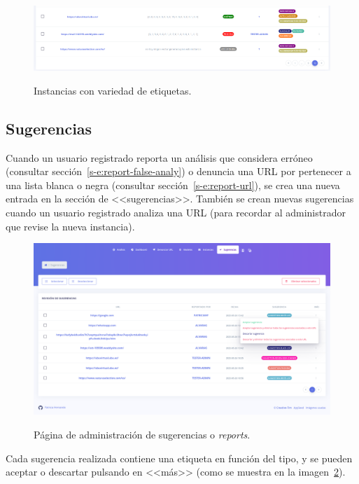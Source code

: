 \begin{figure}[h]
	\caption[Manual de usuario: ejemplos de etiquetas]{Instancias con variedad de etiquetas.}
	\centering
	\includegraphics[width=\textwidth]{../img/anexos/user_guide/6_instances_more_labels}
	\label{e-6:more-labels}
\end{figure}

\subsection{Sugerencias}
\label{s-e:sugerencias}

Cuando un usuario registrado reporta un análisis que considera erróneo (consultar sección~\ref{s-e:report-false-analy}) o denuncia una URL por pertenecer a una lista blanca o negra (consultar sección~\ref{s-e:report-url}), se crea una nueva entrada en la sección de <<sugerencias>>. También se crean nuevas sugerencias cuando un usuario registrado analiza una URL (para recordar al administrador que revise la nueva instancia).

\begin{figure}[h]
	\caption[Manual de usuario: administrar sugerencias]{Página de administración de sugerencias o \textit{reports}.}
	\centering
	\includegraphics[width=\textwidth]{../img/anexos/user_guide/7_reports}
	\label{e-7:reports}
\end{figure}

Cada sugerencia realizada contiene una etiqueta en función del tipo, y se pueden aceptar o descartar pulsando en <<más>> (como se muestra en la imagen~\ref{e-7:reports}).

